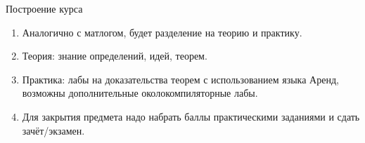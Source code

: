 \documentclass[aspectratio=169]{beamer}
\begin{document}
\begin{frame}{Построение курса}
\begin{enumerate}
\item Аналогично с матлогом, будет разделение на теорию и практику.
\item Теория: знание определений, идей, теорем.
\item Практика: лабы на доказательства теорем с использованием языка Аренд, возможны дополнительные околокомпиляторные лабы.
\item Для закрытия предмета надо набрать баллы практическими заданиями и сдать зачёт/экзамен.
\end{enumerate}
\end{frame}
\end{document}
